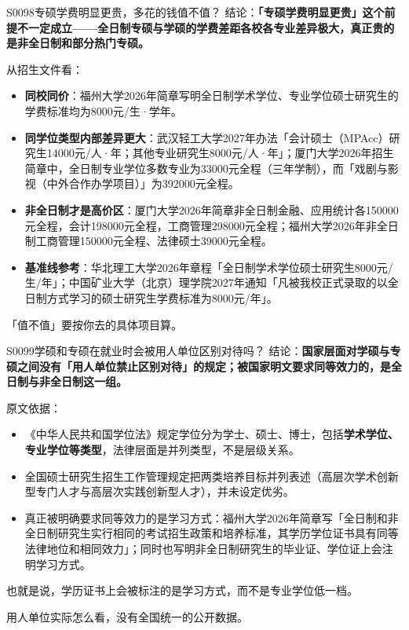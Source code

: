 \begin{qa}{S0098}{专硕学费明显更贵，多花的钱值不值？}
结论：\textbf{「专硕学费明显更贵」这个前提不一定成立——全日制专硕与学硕的学费差距各校各专业差异极大，真正贵的是非全日制和部分热门专硕。}

从招生文件看：
\begin{itemize}
  \item \textbf{同校同价}：福州大学2026年简章写明全日制学术学位、专业学位硕士研究生的学费标准均为8000元/生·学年。
  \item \textbf{同学位类型内部差异更大}：武汉轻工大学2027年办法「会计硕士（MPAcc）研究生14000元/人·年；其他专业研究生8000元/人·年」；厦门大学2026年招生简章中，全日制专业学位多数专业为33000元全程（三年学制），而「戏剧与影视（中外合作办学项目）」为392000元全程。
  \item \textbf{非全日制才是高价区}：厦门大学2026年简章非全日制金融、应用统计各150000元全程，会计198000元全程，工商管理298000元全程；福州大学2026年非全日制工商管理150000元全程、法律硕士39000元全程。
  \item \textbf{基准线参考}：华北理工大学2026年章程「全日制学术学位硕士研究生8000元/生/年」；中国矿业大学（北京）理学院2027年通知「凡被我校正式录取的以全日制方式学习的硕士研究生学费标准为8000元/年」。
\end{itemize}

「值不值」要按你去的具体项目算。
\end{qa}

\begin{qa}{S0099}{学硕和专硕在就业时会被用人单位区别对待吗？}
结论：\textbf{国家层面对学硕与专硕之间没有「用人单位禁止区别对待」的规定；被国家明文要求同等效力的，是全日制与非全日制这一组。}

原文依据：
\begin{itemize}
  \item 《中华人民共和国学位法》规定学位分为学士、硕士、博士，包括\textbf{学术学位、专业学位等类型}，法律层面是并列类型，不是层级关系。
  \item 全国硕士研究生招生工作管理规定把两类培养目标并列表述（高层次学术创新型专门人才与高层次实践创新型人才），并未设定优劣。
  \item 真正被明确要求同等效力的是学习方式：福州大学2026年简章写「全日制和非全日制研究生实行相同的考试招生政策和培养标准，其学历学位证书具有同等法律地位和相同效力」；同时也写明非全日制研究生的毕业证、学位证上会注明学习方式。
\end{itemize}

也就是说，学历证书上会被标注的是学习方式，而不是专业学位低一档。

用人单位实际怎么看，没有全国统一的公开数据。
\end{qa}

